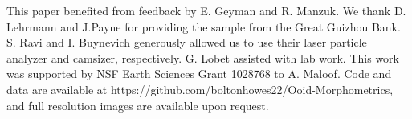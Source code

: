 \documentclass[draft]{agujournal2019}
\begin{document}
%
%

%

%




%
%
%
%
%
%
%
%


\acknowledgments
This paper benefited from feedback by E. Geyman and R. Manzuk. We thank D. Lehrmann and J.Payne for providing the sample from the Great Guizhou Bank. S. Ravi and I. Buynevich generously allowed us to use their laser particle analyzer and camsizer, respectively. G. Lobet assisted with lab work. This work was supported by NSF Earth Sciences Grant 1028768 to A. Maloof. Code and data are available at https://github.com/boltonhowes22/Ooid-Morphometrics, and full resolution images are available upon request.
\end{document}
